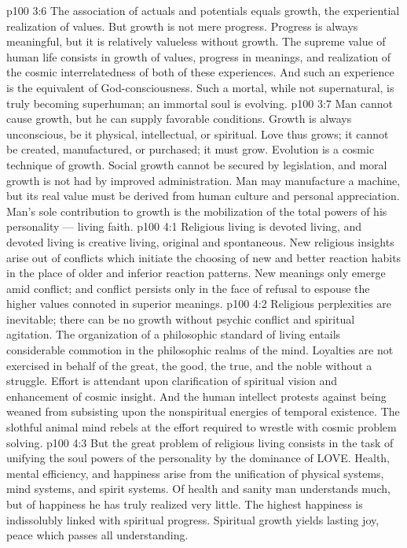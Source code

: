 \vs p100 3:6 The association of actuals and potentials equals growth, the experiential realization of values. But growth is not mere progress. Progress is always meaningful, but it is relatively valueless without growth. The supreme value of human life consists in growth of values, progress in meanings, and realization of the cosmic interrelatedness of both of these experiences. And such an experience is the equivalent of God\hyp{}consciousness. Such a mortal, while not supernatural, is truly becoming superhuman; an immortal soul is evolving.
\vs p100 3:7 Man cannot cause growth, but he can supply favorable conditions. Growth is always unconscious, be it physical, intellectual, or spiritual. Love thus grows; it cannot be created, manufactured, or purchased; it must grow. Evolution is a cosmic technique of growth. Social growth cannot be secured by legislation, and moral growth is not had by improved administration. Man may manufacture a machine, but its real value must be derived from human culture and personal appreciation. Man’s sole contribution to growth is the mobilization of the total powers of his personality --- living faith.
\vs p100 4:1 Religious living is devoted living, and devoted living is creative living, original and spontaneous. New religious insights arise out of conflicts which initiate the choosing of new and better reaction habits in the place of older and inferior reaction patterns. New meanings only emerge amid conflict; and conflict persists only in the face of refusal to espouse the higher values connoted in superior meanings.
\vs p100 4:2 Religious perplexities are inevitable; there can be no growth without psychic conflict and spiritual agitation. The organization of a philosophic standard of living entails considerable commotion in the philosophic realms of the mind. Loyalties are not exercised in behalf of the great, the good, the true, and the noble without a struggle. Effort is attendant upon clarification of spiritual vision and enhancement of cosmic insight. And the human intellect protests against being weaned from subsisting upon the nonspiritual energies of temporal existence. The slothful animal mind rebels at the effort required to wrestle with cosmic problem solving.
\vs p100 4:3 But the great problem of religious living consists in the task of unifying the soul powers of the personality by the dominance of LOVE. Health, mental efficiency, and happiness arise from the unification of physical systems, mind systems, and spirit systems. Of health and sanity man understands much, but of happiness he has truly realized very little. The highest happiness is indissolubly linked with spiritual progress. Spiritual growth yields lasting joy, peace which passes all understanding.
